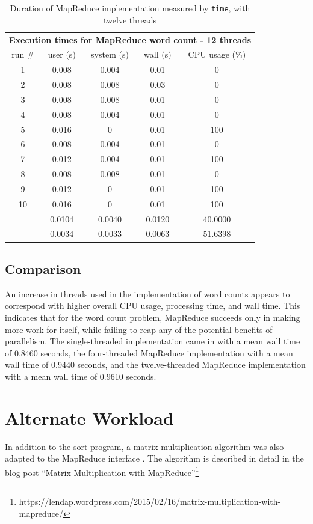 \documentclass[12pt, letterpaper]{article}
\begin{document}
	\begin{table}[h]
	\centering
	\begin{tabular}{ccccc}
	\multicolumn{5}{c}{\cellcolor[HTML]{FFFFC7}\textbf{Execution times for MapReduce word count - 12 threads}} \\
	\rowcolor[HTML]{EFEFEF} 
	run \# & user (s) & system (s) & wall (s) & CPU usage (\%) \\
	1 & 0.008 & 0.004 & 0.01 & 0 \\
	2 & 0.008 & 0.008 & 0.03 & 0 \\
	3 & 0.008 & 0.008 & 0.01 & 0 \\
	4 & 0.008 & 0.004 & 0.01 & 0 \\
	5 & 0.016 & 0 & 0.01 & 100 \\
	6 & 0.008 & 0.004 & 0.01 & 0 \\
	7 & 0.012 & 0.004 & 0.01 & 100 \\
	8 & 0.008 & 0.008 & 0.01 & 0 \\
	9 & 0.012 & 0 & 0.01 & 100 \\
	10 & 0.016 & 0 & 0.01 & 100 \\
	\rowcolor[HTML]{D0F0D0} 
	\multicolumn{1}{r}{\cellcolor[HTML]{9AFF99}mean (s)} & 0.0104 & 0.0040 & 0.0120 & 40.0000 \\
	\rowcolor[HTML]{ECF4FF} 
	\multicolumn{1}{r}{\cellcolor[HTML]{DAE8FC}std. dev. (s)} & 0.0034 & 0.0033 & 0.0063 & 51.6398
	\end{tabular}
	\caption{Duration of MapReduce implementation measured by \texttt{time}, with twelve threads\label{table:MR12ImplWC}}
	\end{table}
\subsection{Comparison}
	An increase in threads used in the implementation of word counts appears to correspond with higher overall CPU usage, processing time, and wall time.
	This indicates that for the word count problem, MapReduce succeeds only in making more work for itself, while failing to reap any of the potential benefits of parallelism.
	The single-threaded implementation came in with a mean wall time of 0.8460 seconds, the four-threaded MapReduce implementation with a mean wall time of 0.9440 seconds, and the twelve-threaded MapReduce implementation with a mean wall time of 0.9610 seconds.
	
\section{Alternate Workload}
In addition to the sort program, a matrix multiplication algorithm was also adapted to the MapReduce interface . The algorithm is described in detail in the blog post “Matrix Multiplication with MapReduce”\footnote{https://lendap.wordpress.com/2015/02/16/matrix-multiplication-with-mapreduce/}
\end{document}
